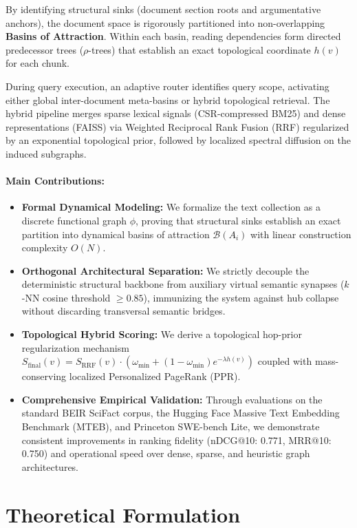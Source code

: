\documentclass[10pt,twocolumn]{article}
\theoremstyle{definition}
\begin{document}
By identifying structural sinks (document section roots and argumentative anchors), the document space is rigorously partitioned into non-overlapping \textbf{Basins of Attraction}. Within each basin, reading dependencies form directed predecessor trees ($\rho$-trees) that establish an exact topological coordinate $h(v)$ for each chunk.

During query execution, an adaptive router identifies query scope, activating either global inter-document meta-basins or hybrid topological retrieval. The hybrid pipeline merges sparse lexical signals (CSR-compressed BM25) and dense representations (FAISS) via Weighted Reciprocal Rank Fusion (RRF) regularized by an exponential topological prior, followed by localized spectral diffusion on the induced subgraphs.

\paragraph{Main Contributions:}
\begin{itemize}
    \item \textbf{Formal Dynamical Modeling:} We formalize the text collection as a discrete functional graph $\phi$, proving that structural sinks establish an exact partition into dynamical basins of attraction $\mathcal{B}(A_i)$ with linear construction complexity $O(N)$.
    \item \textbf{Orthogonal Architectural Separation:} We strictly decouple the deterministic structural backbone from auxiliary virtual semantic synapses ($k$-NN cosine threshold $\ge 0.85$), immunizing the system against hub collapse without discarding transversal semantic bridges.
    \item \textbf{Topological Hybrid Scoring:} We derive a topological hop-prior regularization mechanism $S_{\text{final}}(v) = S_{\text{RRF}}(v) \cdot (\omega_{\min} + (1 - \omega_{\min}) e^{-\lambda h(v)})$ coupled with mass-conserving localized Personalized PageRank (PPR).
    \item \textbf{Comprehensive Empirical Validation:} Through evaluations on the standard BEIR SciFact corpus, the Hugging Face Massive Text Embedding Benchmark (MTEB), and Princeton SWE-bench Lite, we demonstrate consistent improvements in ranking fidelity (nDCG@10: 0.771, MRR@10: 0.750) and operational speed over dense, sparse, and heuristic graph architectures.
\end{itemize}

\section{Theoretical Formulation}
\end{document}
